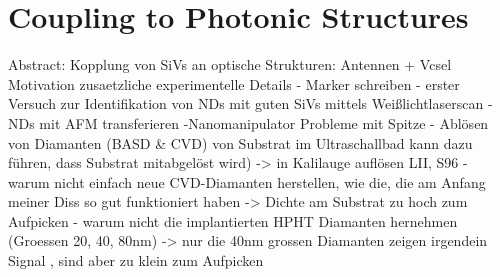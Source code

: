 
\chapter[Coupling NDs]{Coupling \Nds to Photonic Structures}	\label{ch::coupling}

	Abstract: Kopplung von SiVs an optische Strukturen: Antennen + Vcsel
	Motivation
	zusaetzliche experimentelle Details 
				- Marker schreiben
				- erster Versuch zur Identifikation von NDs mit guten SiVs mittels Weißlichtlaserscan
				- NDs mit AFM transferieren
				-Nanomanipulator
					Probleme mit Spitze
				- Ablösen von Diamanten (BASD & CVD) von Substrat im Ultraschallbad kann dazu führen, dass Substrat mitabgelöst wird) -> in Kalilauge auflösen LII, S96
				- warum nicht einfach neue CVD-Diamanten herstellen, wie die, die am Anfang meiner Diss so gut funktioniert haben -> Dichte am Substrat zu hoch zum Aufpicken
				- warum nicht die implantierten HPHT Diamanten hernehmen (Groessen 20, 40, 80nm) -> nur die 40nm grossen Diamanten zeigen irgendein Signal , sind aber zu klein zum Aufpicken

